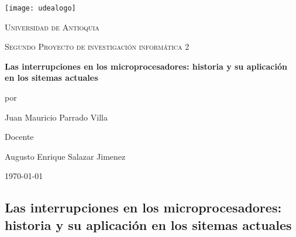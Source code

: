 \documentclass[12pt,a4paper]{report}
\begin{document}
   

    \begin{titlepage}

               \centering


               \texttt{[image: udealogo]}\par\vspace{1cm}

               {\scshape\LARGE Universidad de Antioquia \par}

               \vspace{1cm}

               {\scshape\large Segundo Proyecto de investigación informática 2\par}

               \vspace{1.5cm}

               {\Large\bfseries Las interrupciones en los microprocesadores: historia y su aplicación en los sitemas actuales\par}

               \vspace{2cm}

               por\par

               {\Large Juan Mauricio Parrado Villa\par}


               \vspace{2cm}

               Docente\par

               {\Large Augusto Enrique Salazar Jimenez}


               \vfill


               {\large \today\par}

    \end{titlepage}

    \large

    \begin{center}

        \section*{Las interrupciones en los microprocesadores: historia y su aplicación en los sitemas actuales}

    \end{center}
        
\end{document}
